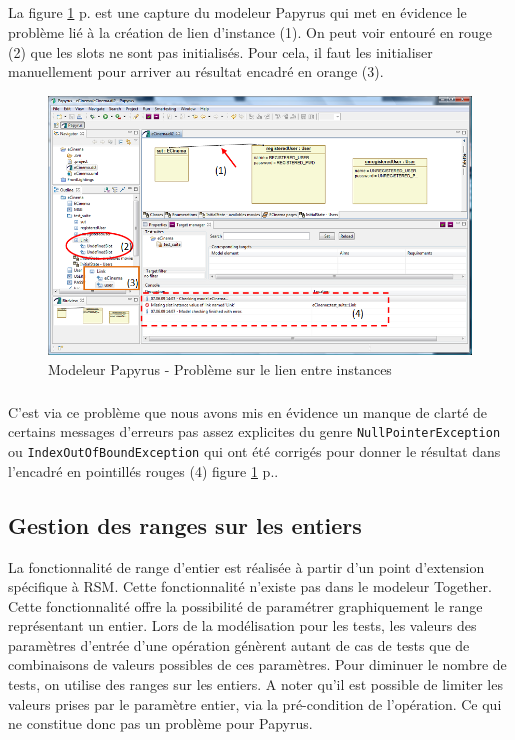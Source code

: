 \subparagraph*{}
La figure \ref{ProblemLink} p.\pageref{ProblemLink} est une capture du modeleur Papyrus qui met en évidence le problème lié à la création de lien d'instance (1).
On peut voir entouré en rouge (2) que les slots ne sont pas initialisés. Pour cela, il faut les initialiser manuellement pour arriver au résultat encadré en orange (3).

\begin{figure}[!ht]
\begin{center}
  \includegraphics[width=.9\linewidth]{images/Papyrus.png}
  \caption{Modeleur Papyrus - Problème sur le lien entre instances}
  \label{ProblemLink}
\end{center}
\end{figure}

\subparagraph*{}
C'est via ce problème que nous avons mis en évidence un manque de clarté de certains messages d'erreurs pas assez explicites du genre \texttt{NullPointerException} ou \newline \texttt{IndexOutOfBoundException} qui ont été corrigés pour donner le résultat dans l'encadré en pointillés rouges (4) figure \ref{ProblemLink} p.\pageref{ProblemLink}.

\subsection{Gestion des ranges sur les entiers}

La fonctionnalité de range d'entier est réalisée à partir d'un point d'extension spécifique à RSM. Cette fonctionnalité n'existe pas dans le modeleur Together. 
Cette fonctionnalité offre la possibilité de paramétrer graphiquement le range représentant un entier.
Lors de la modélisation pour les tests, les valeurs des paramètres d'entrée d'une opération génèrent autant de cas de tests que de combinaisons de valeurs possibles de ces paramètres. 
Pour diminuer le nombre de tests, on utilise des ranges sur les entiers.
A noter qu'il est possible de limiter les valeurs prises par le paramètre entier, via la pré-condition de l'opération.
Ce qui ne constitue donc pas un problème pour Papyrus.

